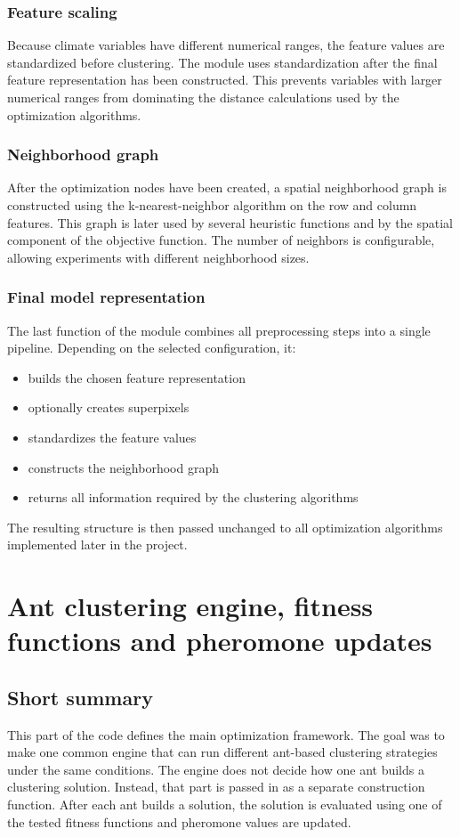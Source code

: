 \documentclass[11pt]{article}
\begin{document}
\subsubsection{Feature scaling}
Because climate variables have different numerical ranges, the feature values are standardized before clustering. The module uses standardization after the final feature representation has been constructed. This prevents variables with larger numerical ranges from dominating the distance calculations used by the optimization algorithms.

\subsubsection{Neighborhood graph}
After the optimization nodes have been created, a spatial neighborhood graph is constructed using the k-nearest-neighbor algorithm on the row and column features. This graph is later used by several heuristic functions and by the spatial component of the objective function. The number of neighbors is configurable, allowing experiments with different neighborhood sizes.

\subsubsection{Final model representation}
The last function of the module combines all preprocessing steps into a single pipeline. Depending on the selected configuration, it:
\begin{itemize}
  \item builds the chosen feature representation
  \item optionally creates superpixels
  \item standardizes the feature values
  \item constructs the neighborhood graph
  \item returns all information required by the clustering algorithms
\end{itemize}
The resulting structure is then passed unchanged to all optimization algorithms implemented later in the project.


\section{Ant clustering engine, fitness functions and pheromone updates}
\label{sec:frameworsk}

\subsection{Short summary}
This part of the code defines the main optimization framework. The goal was to make one common engine that can run different ant-based clustering strategies under the same conditions. The engine does not decide how one ant builds a clustering solution. Instead, that part is passed in as a separate construction function. After each ant builds a solution, the solution is evaluated using one of the tested fitness functions and pheromone values are updated.
\end{document}
